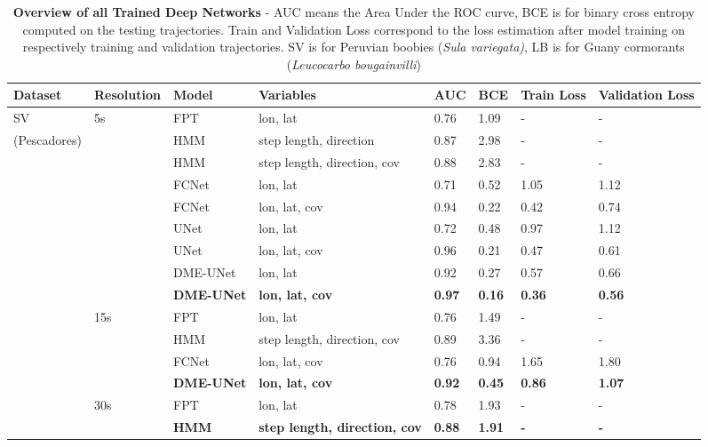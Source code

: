 \documentclass{article}
\begin{document}
\begin{table}[h]
 \caption{\textbf{Overview of all Trained Deep Networks} - AUC means the Area Under the ROC curve, BCE is for binary cross entropy computed on the testing trajectories. Train and Validation Loss correspond to the loss estimation after model training on respectively training and validation trajectories. SV is for Peruvian boobies (\textit{Sula variegata)}, LB is for Guany cormorants (\textit{Leucocarbo bougainvilli})}
  \centering
  \begin{tabular}{llllllll}
    \toprule
    Dataset  &  Resolution &  Model & Variables & AUC & BCE & Train Loss & Validation Loss \\
    \midrule
    SV       & 5s  & FPT    & lon, lat               & 0.76 & 1.09 & - & -     \\
(Pescadores) &     & HMM    & step length, direction & 0.87 & 2.98 & - & -     \\
            &     & HMM    & step length, direction, cov & 0.88 & 2.83 & - & - \\
             &     & FCNet  & lon, lat               & 0.71 & 0.52 & 1.05 & 1.12 \\
             &     & FCNet  & lon, lat, cov          & 0.94 & 0.22 & 0.42 & 0.74  \\
             &     & UNet   & lon, lat               & 0.72 & 0.48 & 0.97 & 1.12  \\
             &     & UNet   & lon, lat, cov          & 0.96 & 0.21 & 0.47 & 0.61  \\
             &     & DME-UNet   & lon, lat   & 0.92 & 0.27 & 0.57 & 0.66  \\
             &     & \textbf{DME-UNet}   & \textbf{lon, lat, cov}  & \textbf{0.97} & \textbf{0.16} & \textbf{0.36} & \textbf{0.56}  \\
             & 15s & FPT    & lon, lat               & 0.76 & 1.49 & - & -      \\
             &     & HMM    & step length, direction, cov & 0.89 & 3.36 & - & -       \\
             &     & FCNet  & lon, lat, cov          & 0.76 & 0.94 & 1.65 & 1.80 \\
             &     & \textbf{DME-UNet}   & \textbf{lon, lat, cov}  & \textbf{0.92} & \textbf{0.45} & \textbf{0.86} & \textbf{1.07}  \\
             & 30s & FPT    & lon, lat               & 0.78 & 1.93 & - & -      \\
             &     & \textbf{HMM}    & \textbf{step length, direction, cov} & \textbf{0.88} & \textbf{1.91} & \textbf{-} & \textbf{-}       \\

\end{tabular}
\end{table}
\end{document}
